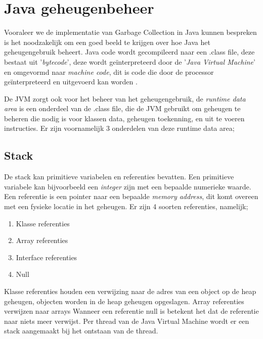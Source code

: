 \section{Java geheugenbeheer}
\label{sec:java geheugenbeheer}
Vooraleer we de implementatie van Garbage Collection in Java kunnen bespreken is het noodzakelijk om een goed beeld te krijgen over hoe Java het geheugengebruik beheert.
Java code wordt gecompileerd naar een .class file, deze bestaat uit '\textit{bytecode}', deze wordt geïnterpreteerd door de '\textit{Java Virtual Machine}' en omgevormd naar \textit{machine code}, dit is code die door de processor geïnterpreteerd en uitgevoerd kan worden .

De JVM zorgt ook voor het beheer van het geheugengebruik, de \textit{runtime data area} is een onderdeel van de .class file, die de JVM gebruikt om geheugen te beheren die nodig is voor klassen data, geheugen toekenning, en uit te voeren instructies.\autocite{Putten2022}
Er zijn voornamelijk 3 onderdelen van deze runtime data area;

\subsection{Stack}
\label{sec:Stack}

De stack kan primitieve variabelen en referenties bevatten.
Een primitieve variabele kan bijvoorbeeld een \textit{integer} zijn met een bepaalde numerieke waarde.
Een referentie is een pointer naar een bepaalde \textit{memory address}, dit komt overeen met een fysieke locatie in het geheugen.\autocite{Huck1993}
Er zijn 4 soorten referenties, namelijk;
\begin{enumerate}
    \item Klasse referenties
    \item Array referenties
    \item Interface referenties
    \item Null
\end{enumerate}
Klasse referenties houden een verwijzing naar de adres van een object op de heap geheugen, objecten worden in de heap geheugen opgeslagen.
Array referenties verwijzen naar arrays
Wanneer een referentie null is betekent het dat de referentie naar niets meer verwijst.
Per thread van de Java Virtual Machine wordt er een stack aangemaakt bij het ontstaan van de thread.


